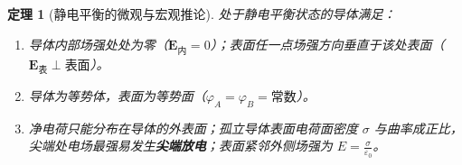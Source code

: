 \documentclass[11pt,a4paper,fontset=fandol]{ctexart}
\newtheorem{theorem}{定理}[section]
\theoremstyle{remark}
\begin{document}
\begin{theorem}[静电平衡的微观与宏观推论]
处于静电平衡状态的导体满足：
\begin{enumerate}
    \item 导体内部场强处处为零（$\bm{E}_{\text{内}} = 0$）；表面任一点场强方向垂直于该处表面（$\bm{E}_{\text{表}} \perp \text{表面}$）。
    \item 导体为等势体，表面为等势面（$\varphi_A = \varphi_B = \text{常数}$）。
    \item 净电荷只能分布在导体的外表面；孤立导体表面电荷面密度 $\sigma$ 与曲率成正比，尖端处电场最强易发生\textbf{尖端放电}；表面紧邻外侧场强为 $E = \frac{\sigma}{\varepsilon_0}$。
\end{enumerate}
\end{theorem}

\end{document}
